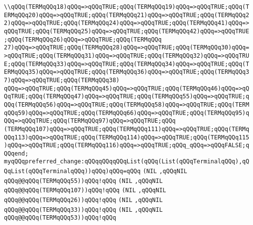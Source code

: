 \verb|\\qQQq(TERMqQQq18)qQQq=>qQQqTRUE;qQQq(TERMqQQq19)qQQq=>qQQqTRUE;qQQq(TERMqQQq20)qQQq=>qQQqTRUE;qQQq(TERMqQQq21)qQQq=>qQQqTRUE;qQQq(TERMqQQq22)qQQq=>qQQqTRUE;qQQq(TERMqQQq24)qQQq=>qQQqTRUE;qQQq(TERMqQQq41)qQQq=>qQQqTRUE;qQQq(TERMqQQq25)qQQq=>qQQqTRUE;qQQq(TERMqQQq42)qQQq=>qQQqTRUE;qQQq(TERMqQQq26)qQQq=>qQQqTRUE;qQQq(TERMqQQq|\newline
\verb|27)qQQq=>qQQqTRUE;qQQq(TERMqQQq28)qQQq=>qQQqTRUE;qQQq(TERMqQQq30)qQQq=>qQQqTRUE;qQQq(TERMqQQq31)qQQq=>qQQqTRUE;qQQq(TERMqQQq32)qQQq=>qQQqTRUE;qQQq(TERMqQQq33)qQQq=>qQQqTRUE;qQQq(TERMqQQq34)qQQq=>qQQqTRUE;qQQq(TERMqQQq35)qQQq=>qQQqTRUE;qQQq(TERMqQQq36)qQQq=>qQQqTRUE;qQQq(TERMqQQq37)qQQq=>qQQqTRUE;qQQq(TERMqQQq38)|\newline
\verb|qQQq=>qQQqTRUE;qQQq(TERMqQQq45)qQQq=>qQQqTRUE;qQQq(TERMqQQq46)qQQq=>qQQqTRUE;qQQq(TERMqQQq47)qQQq=>qQQqTRUE;qQQq(TERMqQQq55)qQQq=>qQQqTRUE;qQQq(TERMqQQq56)qQQq=>qQQqTRUE;qQQq(TERMqQQq58)qQQq=>qQQqTRUE;qQQq(TERMqQQq59)qQQq=>qQQqTRUE;qQQq(TERMqQQq66)qQQq=>qQQqTRUE;qQQq(TERMqQQq95)qQQq=>qQQqTRUE;qQQq(TERMqQQq97)qQQq=>qQQqTRUE;qQQq|\newline
\verb|(TERMqQQq107)qQQq=>qQQqTRUE;qQQq(TERMqQQq111)qQQq=>qQQqTRUE;qQQq(TERMqQQq113)qQQq=>qQQqTRUE;qQQq(TERMqQQq114)qQQq=>qQQqTRUE;qQQq(TERMqQQq115)qQQq=>qQQqTRUE;qQQq(TERMqQQq116)qQQq=>qQQqTRUE;qQQq_qQQq=>qQQqFALSE;qQQqend;|\newline
\verb|myqQQqpreferred_change:qQQqqQQqqQQqList(qQQq(List(qQQqTerminalqQQq),qQQqList(qQQqTerminalqQQq))qQQq)qQQq=qQQq|\newline
\verb|(NIL|\newline
\verb|,qQQqNIL|\newline
\verb|qQQq@@qQQq(TERMqQQq55))qQQq!qQQq|\newline
\verb|(NIL|\newline
\verb|,qQQqNIL|\newline
\verb|qQQq@@qQQq(TERMqQQq107))qQQq!qQQq|\newline
\verb|(NIL|\newline
\verb|,qQQqNIL|\newline
\verb|qQQq@@qQQq(TERMqQQq26))qQQq!qQQq|\newline
\verb|(NIL|\newline
\verb|,qQQqNIL|\newline
\verb|qQQq@@qQQq(TERMqQQq33))qQQq!qQQq|\newline
\verb|(NIL|\newline
\verb|,qQQqNIL|\newline
\verb|qQQq@@qQQq(TERMqQQq53))qQQq!qQQq|\newline
